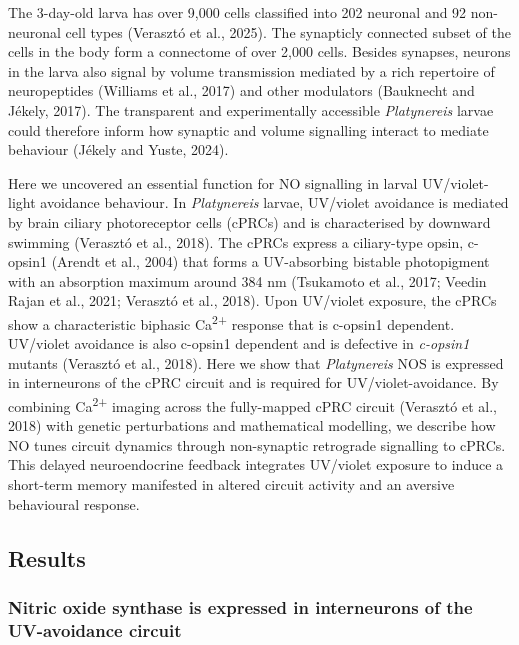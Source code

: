 \documentclass[
  11pt,
  letterpaper,
  DIV=11,
  numbers=noendperiod]{scrartcl}
\begin{document}
The 3-day-old larva has over 9,000 cells classified into 202 neuronal
and 92 non-neuronal cell types (Verasztó et al., 2025). The synapticly
connected subset of the cells in the body form a connectome of over
2,000 cells. Besides synapses, neurons in the larva also signal by
volume transmission mediated by a rich repertoire of neuropeptides
(Williams et al., 2017) and other modulators (Bauknecht and Jékely,
2017). The transparent and experimentally accessible \emph{Platynereis}
larvae could therefore inform how synaptic and volume signalling
interact to mediate behaviour (Jékely and Yuste, 2024).

Here we uncovered an essential function for NO signalling in larval
UV/violet-light avoidance behaviour. In \emph{Platynereis} larvae,
UV/violet avoidance is mediated by brain ciliary photoreceptor cells
(cPRCs) and is characterised by downward swimming (Verasztó et al.,
2018). The cPRCs express a ciliary-type opsin, c-opsin1 (Arendt et al.,
2004) that forms a UV-absorbing bistable photopigment with an absorption
maximum around 384 nm (Tsukamoto et al., 2017; Veedin Rajan et al.,
2021; Verasztó et al., 2018). Upon UV/violet exposure, the cPRCs show a
characteristic biphasic Ca\textsuperscript{2+} response that is c-opsin1
dependent. UV/violet avoidance is also c-opsin1 dependent and is
defective in \emph{c-opsin1} mutants (Verasztó et al., 2018). Here we
show that \emph{Platynereis} NOS is expressed in interneurons of the
cPRC circuit and is required for UV/violet-avoidance. By combining
Ca\textsuperscript{2+} imaging across the fully-mapped cPRC circuit
(Verasztó et al., 2018) with genetic perturbations and mathematical
modelling, we describe how NO tunes circuit dynamics through
non-synaptic retrograde signalling to cPRCs. This delayed neuroendocrine
feedback integrates UV/violet exposure to induce a short-term memory
manifested in altered circuit activity and an aversive behavioural
response.

\subsection{Results}\label{results}

\subsubsection{Nitric oxide synthase is expressed in interneurons of the
UV-avoidance
circuit}\label{nitric-oxide-synthase-is-expressed-in-interneurons-of-the-uv-avoidance-circuit}
\end{document}
